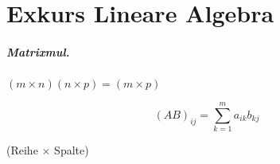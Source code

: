 \chapter{Exkurs Lineare Algebra}

\paragraph{Matrixmul.}
$(m \times n)(n \times p) = (m \times p)$

\begin{mzImportant}
  $$(AB)_{ij} = \sum_{k=1}^m a_{ik}b_{kj}$$

  (Reihe $\times$ Spalte)
\end{mzImportant}